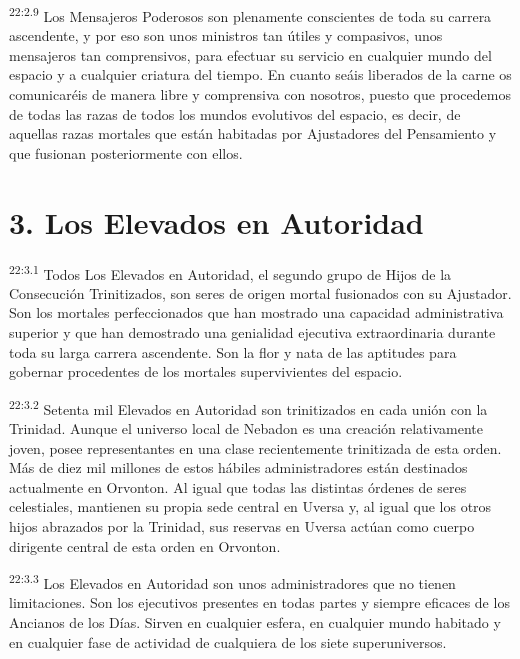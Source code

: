 \par
\textsuperscript{22:2.9} Los Mensajeros Poderosos son plenamente conscientes de toda su carrera ascendente, y por eso son unos ministros tan útiles y compasivos, unos mensajeros tan comprensivos, para efectuar su servicio en cualquier mundo del espacio y a cualquier criatura del tiempo. En cuanto seáis liberados de la carne os comunicaréis de manera libre y comprensiva con nosotros, puesto que procedemos de todas las razas de todos los mundos evolutivos del espacio, es decir, de aquellas razas mortales que están habitadas por Ajustadores del Pensamiento y que fusionan posteriormente con ellos.

\section*{3. Los Elevados en Autoridad}
\par
\textsuperscript{22:3.1} Todos Los Elevados en Autoridad, el segundo grupo de Hijos de la Consecución Trinitizados, son seres de origen mortal fusionados con su Ajustador. Son los mortales perfeccionados que han mostrado una capacidad administrativa superior y que han demostrado una genialidad ejecutiva extraordinaria durante toda su larga carrera ascendente. Son la flor y nata de las aptitudes para gobernar procedentes de los mortales supervivientes del espacio.

\par
\textsuperscript{22:3.2} Setenta mil Elevados en Autoridad son trinitizados en cada unión con la Trinidad. Aunque el universo local de Nebadon es una creación relativamente joven, posee representantes en una clase recientemente trinitizada de esta orden. Más de diez mil millones de estos hábiles administradores están destinados actualmente en Orvonton. Al igual que todas las distintas órdenes de seres celestiales, mantienen su propia sede central en Uversa y, al igual que los otros hijos abrazados por la Trinidad, sus reservas en Uversa actúan como cuerpo dirigente central de esta orden en Orvonton.

\par
\textsuperscript{22:3.3} Los Elevados en Autoridad son unos administradores que no tienen limitaciones. Son los ejecutivos presentes en todas partes y siempre eficaces de los Ancianos de los Días. Sirven en cualquier esfera, en cualquier mundo habitado y en cualquier fase de actividad de cualquiera de los siete superuniversos.

